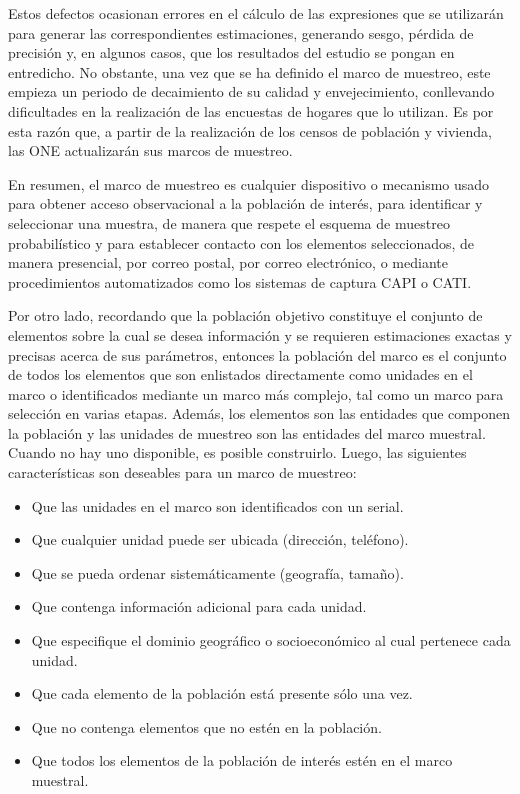 \documentclass[
  10pt,
  spanish,
]{book}
\providecommand{\tightlist}{%
  \setlength{\itemsep}{0pt}\setlength{\parskip}{0pt}}
\begin{document}
Estos defectos ocasionan errores en el cálculo de las expresiones que se utilizarán para generar las correspondientes estimaciones, generando sesgo, pérdida de precisión y, en algunos casos, que los resultados del estudio se pongan en entredicho. No obstante, una vez que se ha definido el marco de muestreo, este empieza un periodo de decaimiento de su calidad y envejecimiento, conllevando dificultades en la realización de las encuestas de hogares que lo utilizan. Es por esta razón que, a partir de la realización de los censos de población y vivienda, las ONE actualizarán sus marcos de muestreo.

En resumen, el marco de muestreo es cualquier dispositivo o mecanismo usado para obtener acceso observacional a la población de interés, para identificar y seleccionar una muestra, de manera que respete el esquema de muestreo probabilístico y para establecer contacto con los elementos seleccionados, de manera presencial, por correo postal, por correo electrónico, o mediante procedimientos automatizados como los sistemas de captura CAPI o CATI.

Por otro lado, recordando que la población objetivo constituye el conjunto de elementos sobre la cual se desea información y se requieren estimaciones exactas y precisas acerca de sus parámetros, entonces la población del marco es el conjunto de todos los elementos que son enlistados directamente como unidades en el marco o identificados mediante un marco más complejo, tal como un marco para selección en varias etapas. Además, los elementos son las entidades que componen la población y las unidades de muestreo son las entidades del marco muestral. Cuando no hay uno disponible, es posible construirlo. Luego, las siguientes características son deseables para un marco de muestreo:

\begin{itemize}
\tightlist
\item
  Que las unidades en el marco son identificados con un serial.
\item
  Que cualquier unidad puede ser ubicada (dirección, teléfono).
\item
  Que se pueda ordenar sistemáticamente (geografía, tamaño).
\item
  Que contenga información adicional para cada unidad.
\item
  Que especifique el dominio geográfico o socioeconómico al cual pertenece cada unidad.
\item
  Que cada elemento de la población está presente sólo una vez.
\item
  Que no contenga elementos que no estén en la población.
\item
  Que todos los elementos de la población de interés estén en el marco muestral.
\end{itemize}
\end{document}
